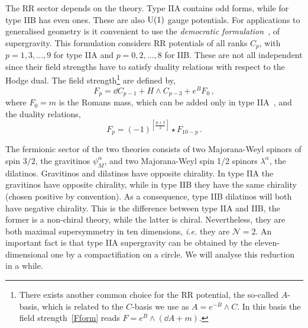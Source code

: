 \documentclass[debug]{phd}
\begin{document}
				The RR sector depends on the theory.
				Type IIA contains odd forms, while for type IIB has even ones.
				These are also $\mathrm{U}(1)$ gauge potentials. For applications to generalised geometry is it convenient to use the \emph{democratic formulation}~\cite{DemSugra},
of supergravity. 		This formulation considers RR potentials of all ranks $C_p$, with $p = 1, 3, \ldots, 9$ for type IIA and $p = 0, 2, \ldots, 8$ for IIB. 
				These are not all independent since their field strengths have to satisfy duality relations with respect to the Hodge dual.
				The field strength\footnote{%
					There exists another common choice for the RR potential, the so-called $A$-basis, which is related to the $C$-basis we use as $A = e^{-B} \wedge C$. 
					In this basis the field strength~\eqref{Fform} reads $F = e^B \wedge (\dd A + m)$.%
					}
				are defined by,
						\begin{equation}\label{Fform}
							F_p = \dd C_{p-1} + H \wedge C_{p-3} + e^B F_0 \, ,
						\end{equation}
				where $F_0 = m$ is the Romans mass, which can be added only in type IIA~\cite{RomansMass}, and 
				the duality relations,
						\begin{equation}\label{Fdual}
							F_p = (-1)^{\left[\frac{p+3}{2}\right]} \star F_{10-p} \, .
						\end{equation}

				 
				 The fermionic sector of the two theories consists of two Majorana-Weyl spinors of spin $3/2$, the gravitinos $\psi_M^\alpha$, and two Majorana-Weyl spin 1/2 spinors $\lambda^\alpha$, the dilatinos.
				 Gravitinos and dilatinos have opposite chirality.
				 In type IIA the gravitinos have opposite chirality, while in type IIB they have the same chirality (chosen positive by convention).
				 As a consequence, type IIB dilatinos will both have negative chirality. 
				 This is the difference between type IIA and IIB, the former is a non-chiral theory, while the latter is chiral.
				 Nevertheless, they are both maximal supersymmetry in ten dimensions, \emph{i.e.} they are $\mathcal{N}=2$.
				 An important fact is that type IIA supergravity can be obtained by the eleven-dimensional one by a compactifiation on a circle.
				 We will analyse this reduction in a while.
				 
\end{document}

